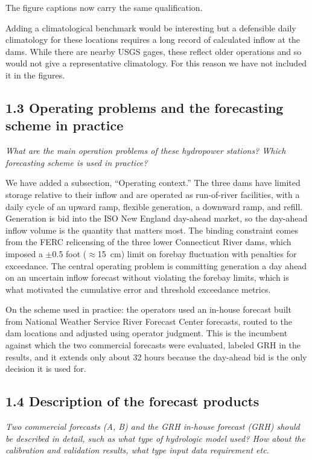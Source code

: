 \documentclass[11pt]{article}
\newenvironment{rc}%
  {\begin{list}{}{\setlength{\leftmargin}{1.5em}\setlength{\rightmargin}{1.5em}%
   \setlength{\topsep}{0.2em}\setlength{\parsep}{0pt}\setlength{\itemsep}{0pt}}%
   \item[]\itshape\color{quotegray}}%
  {\end{list}}
\begin{document}
The figure captions now carry the same qualification.

Adding a climatological benchmark would be interesting but a defensible daily climatology
for these locations requires a long record of calculated inflow at the dams. While there are
nearby USGS gages, these reflect older operations and so would not give a representative
climatology. For this reason we have not included it in the figures. 

\subsection*{1.3 Operating problems and the forecasting scheme in practice}

\begin{rc}
What are the main operation problems of these hydropower stations? Which forecasting
scheme is used in practice?
\end{rc}

We have added a subsection, ``Operating context.'' The three dams have limited storage relative to
their inflow and are operated as run-of-river facilities, with a daily cycle of an upward
ramp, flexible generation, a downward ramp, and refill. Generation is bid into the ISO New
England day-ahead market, so the day-ahead inflow volume is the quantity that matters most.
The binding constraint comes from the FERC relicensing of the three lower Connecticut River
dams, which imposed a $\pm$0.5 foot ($\approx$15~cm) limit on forebay fluctuation with
penalties for exceedance. The central operating problem is committing generation a day
ahead on an uncertain inflow forecast without violating the forebay limits, which is what
motivated the cumulative error and threshold exceedance metrics.

On the scheme used in practice: the operators used an in-house forecast built from National Weather
Service River Forecast Center forecasts, routed to the dam locations and adjusted using operator
judgment. This is the incumbent against which the two commercial forecasts were evaluated, labeled
GRH in the results, and it extends only about 32 hours because the day-ahead bid is the only
decision it is used for.

\subsection*{1.4 Description of the forecast products}

\begin{rc}
Two commercial forecasts (A, B) and the GRH in-house forecast (GRH) should be
described in detail, such as what type of hydrologic model used? How about the
calibration and validation results, what type input data requirement etc.
\end{rc}
\end{document}
